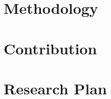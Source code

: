 \documentclass{article}
\begin{document}
	
	\section{Methodology}
	
	\section{Contribution}
	
	\section{Research Plan}
	
	
	
	
\end{document}
